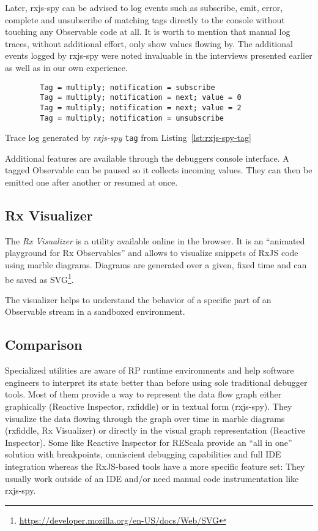 \documentclass[12pt,a4paper]{article}
\begin{document}
Later, rxjs-spy can be advised to log events such as subscribe, emit, error, complete and unsubscribe of matching tags directly to the console without touching any Observable code at all. It is worth to mention that manual log traces, without additional effort, only show values flowing by. The additional events logged by rxjs-spy were noted invaluable in the interviews presented earlier as well as in our own experience.

\begin{listing}[H]
	\begin{verbatim}
		Tag = multiply; notification = subscribe
		Tag = multiply; notification = next; value = 0
		Tag = multiply; notification = next; value = 2
		Tag = multiply; notification = unsubscribe
	\end{verbatim}
	\caption{Trace log generated by \emph{rxjs-spy} \texttt{tag} from Listing~\ref{lst:rxjs-spy-tag}}
	\label{lst:rxjs-spy-log}
\end{listing}

Additional features are available through the debuggers console interface. A tagged Observable can be paused so it collects incoming values. They can then be emitted one after another or resumed at once.

\subsection{Rx Visualizer}

The \emph{Rx Visualizer}\cite{rxviz} is a utility available online in the browser. It is an ``animated playground for Rx Observables''\cite{rxviz} and allows to visualize snippets of RxJS code using marble diagrams. Diagrams are generated over a given, fixed time and can be saved as SVG\footnote{\url{https://developer.mozilla.org/en-US/docs/Web/SVG}}.

The visualizer helps to understand the behavior of a specific part of an Observable stream in a sandboxed environment.

\subsection{Comparison}

Specialized utilities are aware of RP runtime environments and help software engineers to interpret its state better than before using sole traditional debugger tools. Most of them provide a way to represent the data flow graph either graphically (Reactive Inspector, rxfiddle) or in textual form (rxjs-spy). They visualize the data flowing through the graph over time in marble diagrams (rxfiddle, Rx Visualizer) or directly in the visual graph representation (Reactive Inspector). Some like Reactive Inspector for REScala provide an ``all in one'' solution with breakpoints, omniscient debugging capabilities and full IDE integration whereas the RxJS-based tools have a more specific feature set: They usually work outside of an IDE and/or need manual code instrumentation like rxjs-spy.
\end{document}
